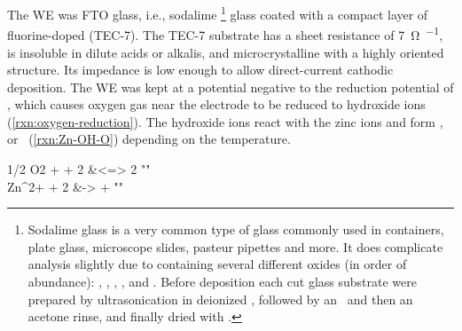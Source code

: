 \documentclass[webedition,openright,titles,swedish,english]{LuaUUThesis}\usepackage[]{graphicx}\usepackage[]{xcolor}
\makeatletter
\newcommand{\ie}{i.e.}
\newenvironment{subreactions}{%
   \refstepcounter{reaction}%
   \protected@edef\theparentequation{\thereaction}%
   \setcounter{parentequation}{\value{reaction}}%
   \setcounter{reaction}{0}%
   \def\thereaction{\theparentequation\alph{reaction}}%
   \ignorespaces
}{%
   \setcounter{reaction}{\value{parentequation}}%
   \ignorespacesafterend
}
\makeatother
\begin{document}
The \gls{WE} was \gls{FTO} glass, \ie, sodalime%
\footnote{%
   Sodalime glass is a very common type of glass commonly used in containers, plate glass,
   microscope slides, pasteur pipettes and more.
   It does complicate analysis slightly due to containing several different oxides (in order of abundance):
   , , , , and .
   Before deposition each cut glass substrate were prepared by ultrasonication
   in deionized \water, followed by an \EtOH\ and then an acetone rinse,
   and finally dried with .
}
glass coated with a compact
layer of fluorine-doped \tinox (TEC-7).
The TEC-7 substrate has a sheet resistance of \qty{7}{\ohm\per\sq},
is insoluble in dilute acids or alkalis,
and microcrystalline with a highly oriented structure.
Its impedance is low enough to allow direct-current cathodic deposition.
The \gls{WE} was kept at a potential negative to the reduction potential
of , which causes oxygen gas near the electrode to be reduced to
hydroxide ions (\cref{rxn:oxygen-reduction}). The hydroxide ions react with the
zinc ions and form ,  or \ZnO\ (\cref{rxn:Zn-OH-O})
depending on the temperature.
\begin{subreactions}\begin{reactions}
1/2 O2 + \water{} + 2 \electron{} &<=> 2 \hydroxide{}  "\label{rxn:oxygen-reduction}" \\
Zn^{2+} + 2 \hydroxide{} &-> \ZnO{} + \water{}  "\label{rxn:Zn-OH-O}"
\end{reactions}\end{subreactions}
\addtocounter{reaction}{-1}
\vspace{-\baselineskip}%
\end{document}

